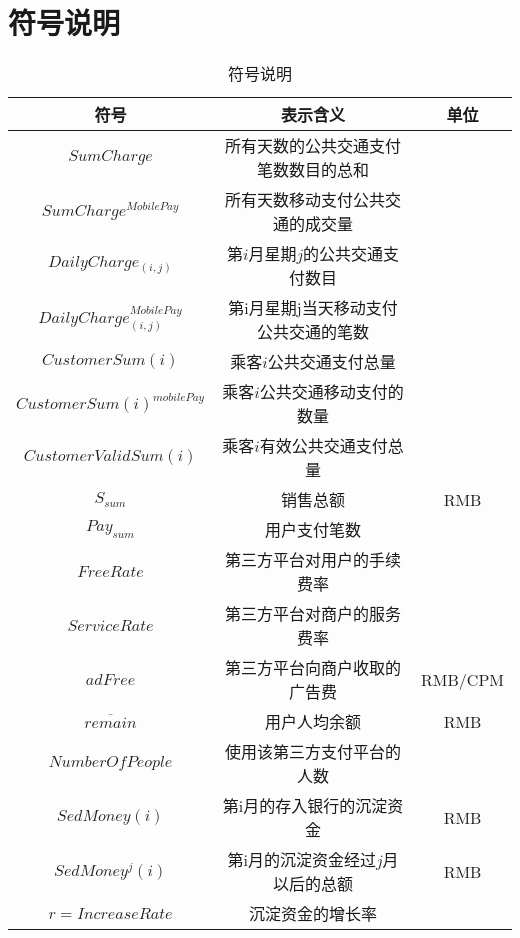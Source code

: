 \documentclass[withoutpreface,bwprint]{cumcmthesis} %
\begin{document}
\section{符号说明}
\begin{center}
\makeatletter{}\makeatother
\begin{table}[htbp]
\centering
\caption{符号说明}\label{tab:aStrangeTable}\centering%
\begin{tabular}{c|c|c}\hline
符号& 表示含义& 单位\\\hline
$SumCharge$ & 所有天数的公共交通支付笔数数目的总和 & \\
$SumCharge^{MobilePay}$ & 所有天数移动支付公共交通的成交量 & \\
$DailyCharge_{(i,j)}$&第$i$月星期$j$的公共交通支付数目&\\
$DailyCharge^{MobilePay}_{(i,j)}$&第i月星期j当天移动支付公共交通的笔数&\\
$CustomerSum(i)$&乘客$i$公共交通支付总量&\\
$CustomerSum(i)^{mobilePay}$&乘客$i$公共交通移动支付的数量&\\
$CustomerValidSum(i)$&乘客$i$有效公共交通支付总量&\\
$S_{sum}$&销售总额&RMB\\
$Pay_{sum}$&用户支付笔数&\\
$FreeRate$&第三方平台对用户的手续费率&\\
$ServiceRate$&第三方平台对商户的服务费率&\\
$adFree$&第三方平台向商户收取的广告费&RMB/CPM\\
$\overline {remain}$&用户人均余额&RMB\\
${NumberOfPeople}$&使用该第三方支付平台的人数&\\
$SedMoney(i)$&第i月的存入银行的沉淀资金&RMB\\
$SedMoney^j(i)$&第i月的沉淀资金经过$j$月以后的总额&RMB\\
$r=IncreaseRate$&沉淀资金的增长率&\\\hline
\end{tabular}
\end{table}
\end{center}
\end{document}
